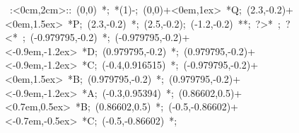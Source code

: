 %


\hbox{
\xy    <2cm,0cm>:<0cm,2cm>::
       (0,0) *{\bullet}; *\ellipse(1){-}; 
       (0,0)+<0em,1ex> *{Q};
       (2.3,-0.2)+<0em,1.5ex> *{P};
       (2.3,-0.2) *{\bullet};
       (2.5,-0.2); (-1.2,-0.2) **\dir{-}; ?>* \dir{>}; ?<* \dir{<};
       (-0.979795,-0.2) *{\bullet}; 
       (-0.979795,-0.2)+<-0.9em,-1.2ex> *{D};
       (0.979795,-0.2) *{\bullet}; 
       (0.979795,-0.2)+<-0.9em,-1.2ex> *{C};
       (-0.4,0.916515) *{\bullet}; 
       (-0.979795,-0.2)+<0em,1.5ex> *{B};
       (0.979795,-0.2) *{\bullet}; 
       (0.979795,-0.2)+<-0.9em,-1.2ex> *{A};
       (-0.3,0.95394) *{\bullet};
       (0.86602,0.5)+<0.7em,0.5ex> *{B};  
       (0.86602,0.5) *{\bullet};  
       (-0.5,-0.86602)+<-0.7em,-0.5ex> *{C};  
       (-0.5,-0.86602) *{\bullet};  
\endxy}


